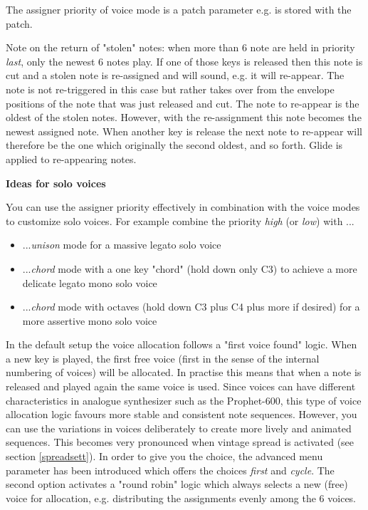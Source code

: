 The assigner priority of voice mode is a patch parameter e.g. is stored with the patch. 

Note on the return of "stolen" notes: when more than 6 note are held in priority \textit{last}, only the newest 6 notes play. If one of those keys is released then this note is cut and a stolen note is re-assigned and will sound, e.g. it will re-appear. The note is not re-triggered in this case but rather takes over from the envelope positions of the note that was just released and cut. The note to re-appear is the oldest of the stolen notes. However, with the re-assignment this note becomes the newest assigned note. When another key is release the next note to re-appear will therefore be the one which originally the second oldest, and so forth. Glide is applied to re-appearing notes.

\textbf{Ideas for solo voices}

You can use the assigner priority effectively in combination with the voice modes to customize solo voices. For example combine the priority \textit{high} (or \textit{low}) with ...
\begin{itemize}
  \item ...\textit{unison} mode for a massive legato solo voice
  \item ...\textit{chord} mode with a one key "chord" (hold down only C3) to achieve a more delicate legato mono solo voice
  \item ...\textit{chord} mode with octaves (hold down C3 plus C4 plus more if desired) for a more assertive mono solo voice   
\end{itemize}

In the default setup the voice allocation follows a "first voice found" logic. When a new key is played, the first free voice (first in the sense of the internal numbering of voices) will be allocated. In practise this means that when a note is released and played again the same voice is used. Since voices can have different characteristics in analogue synthesizer such as the Prophet-600, this type of voice allocation logic favours more stable and consistent note sequences. However, you can use the variations in voices deliberately to create more lively and animated sequences. This becomes very pronounced when vintage spread is activated (see section \ref{spreadsett}). In order to give you the choice, the advanced menu parameter \assign has been introduced which offers the choices \textit{first} and \textit{cycle}. The second option activates a "round robin" logic which always selects a new (free) voice for allocation, e.g. distributing the assignments evenly among the 6 voices.   
